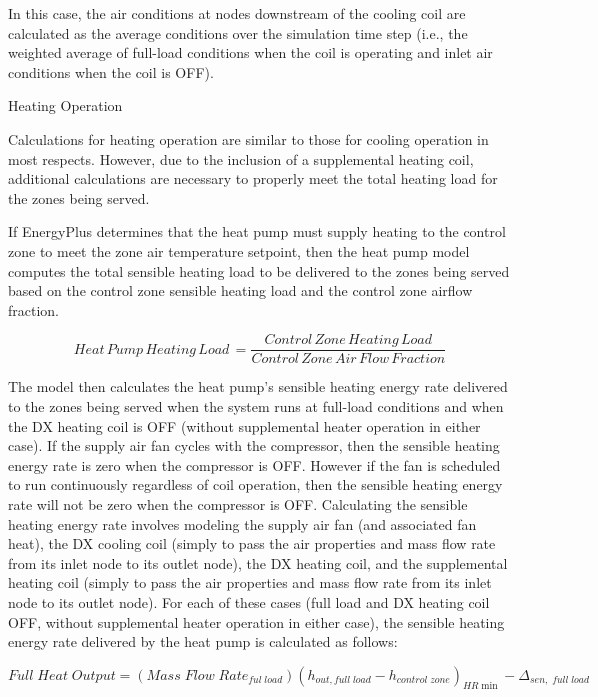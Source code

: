 In this case, the air conditions at nodes downstream of the cooling coil are calculated as the average conditions over the simulation time step (i.e., the weighted average of full-load conditions when the coil is operating and inlet air conditions when the coil is OFF).

Heating Operation

Calculations for heating operation are similar to those for cooling operation in most respects. However, due to the inclusion of a supplemental heating coil, additional calculations are necessary to properly meet the total heating load for the zones being served.

If EnergyPlus determines that the heat pump must supply heating to the control zone to meet the zone air temperature setpoint, then the heat pump model computes the total sensible heating load to be delivered to the zones being served based on the control zone sensible heating load and the control zone airflow fraction.

\begin{equation}
Heat\,Pump\,Heating\,Load\, = \frac{{Control\,Zone\,Heating\,Load}}{{Control\,Zone\,Air\,Flow\,Fraction}}
\end{equation}

The model then calculates the heat pump's sensible heating energy rate delivered to the zones being served when the system runs at full-load conditions and when the DX heating coil is OFF (without supplemental heater operation in either case). If the supply air fan cycles with the compressor, then the sensible heating energy rate is zero when the compressor is OFF. However if the fan is scheduled to run continuously regardless of coil operation, then the sensible heating energy rate will not be zero when the compressor is OFF. Calculating the sensible heating energy rate involves modeling the supply air fan (and associated fan heat), the DX cooling coil (simply to pass the air properties and mass flow rate from its inlet node to its outlet node), the DX heating coil, and the supplemental heating coil (simply to pass the air properties and mass flow rate from its inlet node to its outlet node). For each of these cases (full load and DX heating coil OFF, without supplemental heater operation in either case), the sensible heating energy rate delivered by the heat pump is calculated as follows:

\begin{equation}
Full\;Heat\;Output = (Mass\;Flow\;Rat{e_{ful\;load}}){({h_{out,full\;load}} - {h_{control\;zone}})_{HR\min }} - {\Delta_{sen,\;full\;load}}
\end{equation}

